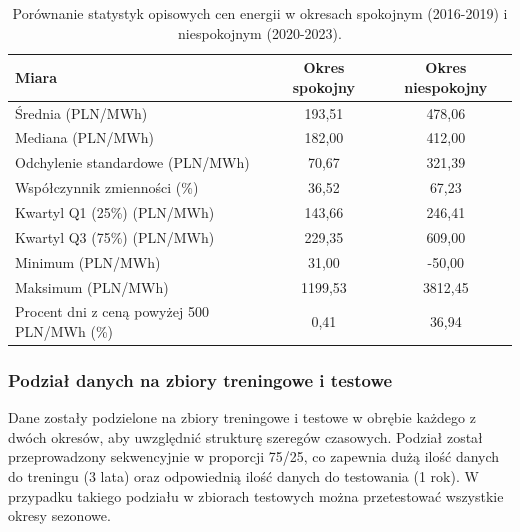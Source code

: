 \begin{table}[h]
    \centering
    \caption{Porównanie statystyk opisowych cen energii w okresach spokojnym (2016-2019) i niespokojnym (2020-2023).}
    \label{tab:periods_stats_comparison}
    \begin{tabular}{|l|c|c|}
        \hline
        \textbf{Miara} & \textbf{Okres spokojny} & \textbf{Okres niespokojny} \\
        \hline
        Średnia (PLN/MWh) & 193,51 & 478,06 \\
        \hline
        Mediana (PLN/MWh) & 182,00 & 412,00 \\
        \hline
        Odchylenie standardowe (PLN/MWh) & 70,67 & 321,39 \\
        \hline
        Współczynnik zmienności (\%) & 36,52 & 67,23 \\
        \hline
        Kwartyl Q1 (25\%) (PLN/MWh) & 143,66 & 246,41 \\
        \hline
        Kwartyl Q3 (75\%) (PLN/MWh) & 229,35 & 609,00 \\
        \hline
        Minimum (PLN/MWh) & 31,00 & -50,00 \\
        \hline
        Maksimum (PLN/MWh) & 1199,53 & 3812,45 \\
        \hline
        Procent dni z ceną powyżej 500 PLN/MWh (\%) & 0,41 & 36,94 \\
        \hline
    \end{tabular}
\end{table}

\subsubsection{Podział danych na zbiory treningowe i testowe}

Dane zostały podzielone na zbiory treningowe i testowe w obrębie każdego z dwóch okresów, aby uwzględnić strukturę szeregów czasowych. Podział został przeprowadzony sekwencyjnie w proporcji 75/25, co zapewnia dużą ilość danych do treningu (3 lata) oraz odpowiednią ilość danych do testowania (1 rok). W przypadku takiego podziału w zbiorach testowych można przetestować wszystkie okresy sezonowe.

